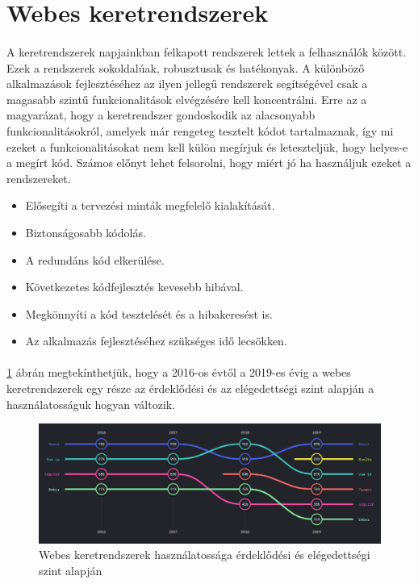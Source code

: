 \section{Webes keretrendszerek}
	\paragraph{}
	A keretrendszerek \cite{frameworks} napjainkban felkapott rendszerek lettek a felhasználók között. Ezek a rendszerek sokoldalúak, robusztusak és hatékonyak. A különböző alkalmazások fejlesztéséhez az ilyen jellegű rendszerek segítségével csak a magasabb szintű funkcionalitások elvégzésére kell koncentrálni. Erre az a magyarázat, hogy a keretrendszer gondoskodik az alacsonyabb funkcionalitásokról, amelyek már rengeteg tesztelt kódot tartalmaznak, így mi ezeket a funkcionalitásokat nem kell külön megírjuk és leteszteljük, hogy helyes-e a megírt kód. Számos előnyt lehet felsorolni, hogy miért jó ha használjuk ezeket a rendszereket.
	\begin{itemize}
		\item Elősegíti a tervezési minták megfelelő kialakítását.
		\item Biztonságosabb kódolás.
		\item A redundáns kód elkerülése.
		\item Következetes kódfejlesztés kevesebb hibával.
		\item Megkönnyíti a kód tesztelését és a hibakeresést is.
		\item Az alkalmazás fejlesztéséhez szükséges idő lecsökken.
	\end{itemize}
	\paragraph{}
	 \ref{fig:vueang} ábrán megtekínthetjük, hogy a 2016-os évtől a 2019-es évig a webes keretrendszerek egy része az érdeklődési és az elégedettségi szint alapján a használatosságuk hogyan változik.
	
	\begin{figure}
		\centering
		\includegraphics[scale=0.5]{figures/images/vueang.png}
		\caption{Webes keretrendszerek használatossága érdeklődési és elégedettségi szint alapján \cite{vueanginterest}}
		\label{fig:vueang}
	\end{figure}

